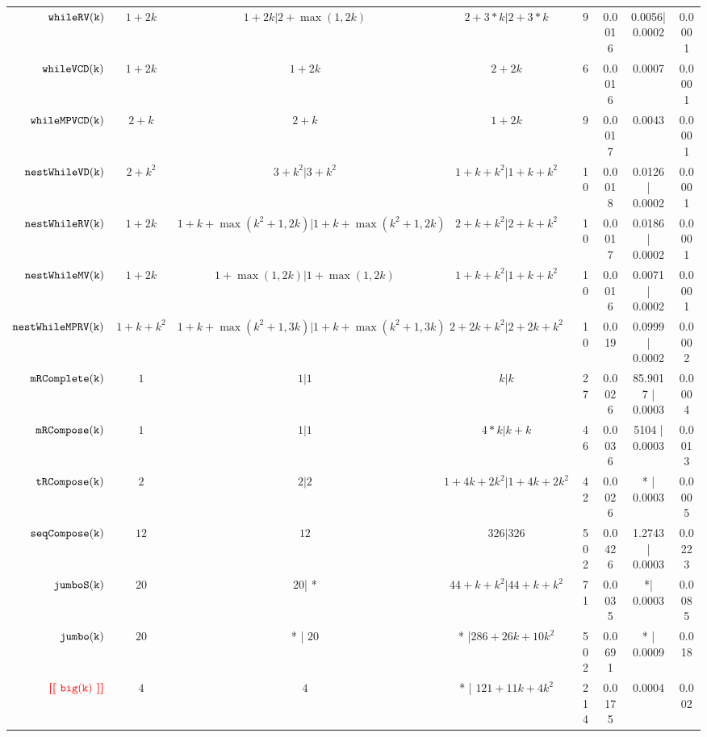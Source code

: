 {\begin {table}[H]
\begin{center}
{\begin{tabular}{ r | c | c | c | c | c | c | c  }
         $  \mathtt{whileRV(k)}$ & $1 + 2k$ &  $1 + 2k| 2 + \max(1,2k)$ & $2 + 3 * k| 2 + 3*k$  &  9 & 0.0016 & 0.0056| 0.0002 & 0.0001  \\
         $  \mathtt{whileVCD(k)}$ & $1 + 2k$ &   $1 + 2k$ & $2 + 2k$  &  6 & 0.0016 & 0.0007 & 0.0001 \\
         $  \mathtt{whileMPVCD(k)}$ & $2 + k$ &  $2 + k$ & $1 + 2k$   &   9 & 0.0017 & 0.0043 & 0.0001 \\
         $  \mathtt{nestWhileVD(k)}$ & $2 + k^2$ &   $3 + k^2| 3 + k^2$ & $1 + k + k^2|1 + k + k^2 $   &  10 & 0.0018 & 0.0126 | 0.0002 & 0.0001  \\
         $  \mathtt{nestWhileRV(k)}$ & $1 + 2k$ &   $ 1 + k +  \max(k^2 +1,2k) | 1 + k +  \max(k^2 +1,2k)$ &  $2 + k + k^2| 2 + k + k^2$   &  10 & 0.0017 & 0.0186 | 0.0002 & 0.0001  \\
         $  \mathtt{nestWhileMV(k)}$ & $1 + 2k $ & $1 + \max(1,2k) | 1 + \max(1,2k)$ &  $1 + k + k^2 |1 + k + k^2$  & 10 & 0.0016 & 0.0071 | 0.0002 & 0.0001 \\
         $  \mathtt{nestWhileMPRV(k)}$ & $1 + k + k^2$ &  $1 + k + \max(k^2+1,3k)  | 1 + k + \max(k^2+1,3k)$ &  $2 + 2k + k^2 | 2 + 2k + k^2$  &  10 & 0.019 & 0.0999 | 0.0002 & 0.0002 \\
         $  \mathtt{mRComplete(k)}$ & $1$ & $1 | 1 $ & $k |k$   &  27 & 0.0026 & 85.9017 | 0.0003 & 0.0004 \\
         $  \mathtt{mRCompose(k)}$ & $1$ & $1 | 1$ & $4*k | k+ k$   &  46 & 0.0036 & 5104 | 0.0003 &  0.0013\\
         $  \mathtt{tRCompose(k)}$ & $2$ &  $2| 2$ & $1 + 4k + 2 k^2 | 1 + 4k + 2k^2$  &  42 & 0.0026 & * | 0.0003 & 0.0005\\
         $  \mathtt{seqCompose(k)}$ & $12$ & $12  $ & $326| 326$  &  502 & 0.0426  & 1.2743 | 0.0003 & 0.0223 \\
         $  \mathtt{jumboS(k)}$ & $20$ & $20$| *  & $44 + k + k^2 | 44 + k + k^2$  &  71 & 0.0035 & *| 0.0003 &  0.0085 \\
         $  \mathtt{jumbo(k)}$ & $20$ &  * | $20$  &  * |$286+26k+10k^2$   &  502 & 0.0691 & * | 0.0009 & 0.018 \\
         $  {\color{red}\textbf{[[ \ensuremath{\mathtt{big(k)}} ]]}} $ & $4$ &  $4$ & * | $121+11k+4k^2$  &  214 & 0.0175 & 0.0004 & 0.002 
        \end{tabular}
}
\end{center}
\end{table}
}